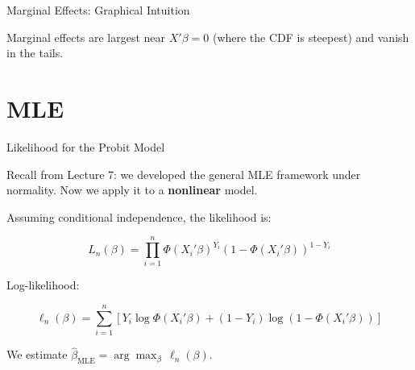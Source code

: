 \documentclass[aspectratio=169]{beamer}
\numberwithin{equation}{section}
\begin{document}

\begin{frame}{Marginal Effects: Graphical Intuition}

\begin{center}
\end{center}

\pause

Marginal effects are largest near $X'\beta = 0$ (where the CDF is steepest) and vanish in the tails.

\end{frame}

\section{MLE}

\begin{frame}{Likelihood for the Probit Model}

Recall from Lecture 7: we developed the general MLE framework under normality. Now we apply it to a \textbf{nonlinear} model.

\pause

\bigskip

Assuming conditional independence, the likelihood is:

\[
L_n(\beta)
=
\prod_{i=1}^n
\Phi(X_i'\beta)^{Y_i}
\left(1-\Phi(X_i'\beta)\right)^{1-Y_i}
\]

\pause

Log-likelihood:

\[
\ell_n(\beta)
=
\sum_{i=1}^n
\left[
Y_i \log \Phi(X_i'\beta)
+
(1-Y_i)\log\left(1-\Phi(X_i'\beta)\right)
\right]
\]

\pause

We estimate $\hat\beta_{\text{MLE}} = \arg\max_\beta \, \ell_n(\beta)$.

\end{frame}
\end{document}
